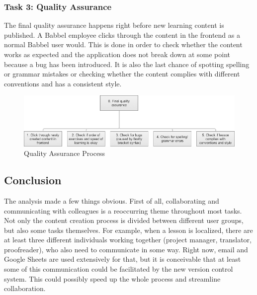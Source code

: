 
\subsubsection{Task 3: Quality Assurance} \label{sec:task-qa}
The final quality assurance happens right before new learning content is published. A Babbel employee clicks through the content in the frontend as a normal Babbel user would. This is done in order to check whether the content works as expected and the application does not break down at some point because a bug has been introduced. It is also the last chance of spotting spelling or grammar mistakes or checking whether the content complies with different conventions and has a consistent style.

\begin{figure}[h]
 \centering
 \includegraphics[width=\textwidth]{images/task-analysis/quality_assurance}
 \caption{Quality Assurance Process}
 \label{fig:qa-process}
\end{figure}

\subsection{Conclusion}
The analysis made a few things obvious. First of all, collaborating and communicating with colleagues is a reoccurring theme throughout most tasks. Not only the content creation process is divided between different user groups, but also some tasks themselves. For example, when a lesson is localized, there are at least three different individuals working together (project manager, translator, proofreader), who also need to communicate in some way. Right now, email and Google Sheets are used extensively for that, but it is conceivable that at least some of this communication could be facilitated by the new version control system. This could possibly speed up the whole process and streamline collaboration.

